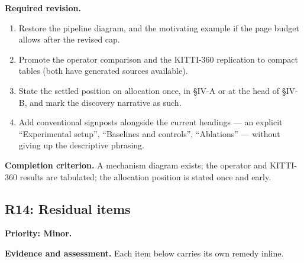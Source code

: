 \documentclass[11pt,a4paper]{article}
\newcommand{\finding}[3]{\subsection{#1: #3}\label{rev:#1}\textbf{Priority: #2.}}
\newcommand{\evidence}{\par\textbf{Evidence and assessment.} }
\newcommand{\action}{\par\textbf{Required revision.} }
\newcommand{\acceptance}{\par\textbf{Completion criterion.} }
\begin{document}
\action
\begin{enumerate}
\item Restore the pipeline diagram, and the motivating example if the page
  budget allows after the revised cap.
\item Promote the operator comparison and the KITTI-360 replication to compact
  tables (both have generated sources available).
\item State the settled position on allocation once, in \S IV-A or at the head
  of \S IV-B, and mark the discovery narrative as such.
\item Add conventional signposts alongside the current headings --- an explicit
  ``Experimental setup'', ``Baselines and controls'', ``Ablations'' --- without
  giving up the descriptive phrasing.
\end{enumerate}

\acceptance
A mechanism diagram exists; the operator and KITTI-360 results are tabulated;
the allocation position is stated once and early.

\finding{R14}{Minor}{Residual items}

\evidence Each item below carries its own remedy inline.
\end{document}

